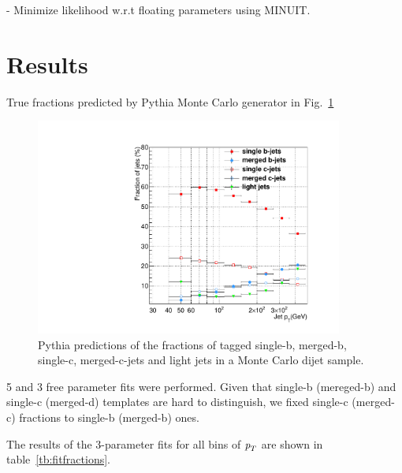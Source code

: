 - Minimize likelihood w.r.t floating parameters using {\sc MINUIT}. %




\section{Results}\label{sec:FitsResults}

True fractions predicted by {\sc Pythia} Monte Carlo generator in Fig.~\ref{fig:truefractions}


\begin{figure}[tp]
\centering
\includegraphics[width=0.9\textwidth]{TrueFractions_NominalPythia.pdf}
\caption{Pythia predictions of the fractions of tagged single-b, merged-b, single-c, merged-c-jets and light jets in a Monte Carlo dijet sample.}
\label{fig:truefractions}
\end{figure}


5 and 3 free parameter fits were performed. Given that single-b (mereged-b) and single-c (merged-d) templates are hard to distinguish, we fixed single-c (merged-c) fractions to single-b (merged-b) ones.



The results of the 3-parameter fits for all bins of ${\emph{p}_{T}}$ are shown in table~\ref{tb:fitfractions}.



